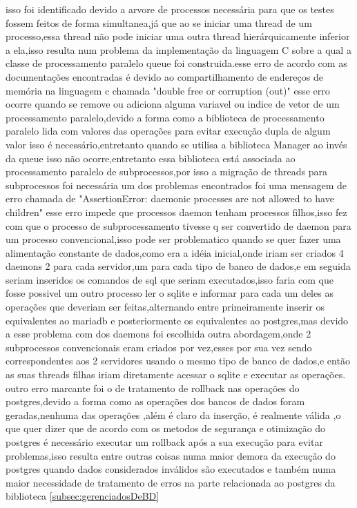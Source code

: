 \documentclass[
	12pt,				%
	openright,			%
	oneside,			%
	a4paper,			%
	english,			%
	french,				%
	spanish,			%
	brazil,				%
	]{abntex2}
\begin{document}
isso foi identificado devido a arvore de processos necessária para que os testes fossem feitos de forma simultanea,já que ao se iniciar uma thread de um processo,essa thread não pode iniciar uma outra thread hierárquicamente inferior a ela,isso resulta num problema da implementação da linguagem C sobre a qual a classe de processamento paralelo queue foi construida.esse erro de acordo com as documentações encontradas é devido ao compartilhamento de endereços de memória na linguagem c chamada "double free or corruption (out)" esse erro ocorre quando se remove ou adiciona alguma variavel ou indice de vetor de um processamento paralelo,devido a forma como a biblioteca de processamento paralelo lida com valores das operações para evitar execução dupla de algum valor isso é necessário,entretanto quando se utilisa a biblioteca Manager ao invés da queue isso não ocorre,entretanto essa biblioteca está associada ao processamento paralelo de subprocessos,por isso a migração de threads para subprocessos foi necessária\newline
um dos problemas encontrados foi uma mensagem de erro chamada de "AssertionError: daemonic processes are not allowed to have children" esse erro impede que processos daemon tenham processos filhos,isso fez com que o processo de subprocessamento tivesse q ser convertido de daemon para um processo convencional,isso pode ser problematico quando se quer fazer uma alimentação constante de dados,como era a idéia inicial,onde iriam ser criados 4 daemons 2 para cada servidor,um para cada tipo de banco de dados,e em seguida seriam inseridos os comandos de sql que seriam executados,isso faria com que fosse possivel um outro processo ler o sqlite e informar para cada um deles as operações que deveriam ser feitas,alternando entre primeiramente inserir os equivalentes ao mariadb e posteriormente os equivalentes ao postgres,mas devido a esse problema com dos daemons foi escolhida outra abordagem,onde 2 subprocessos convencionais eram criados por vez,esses por sua vez sendo correspondentes aos 2 servidores usando o mesmo tipo de banco de dados,e então as suas threads filhas iriam diretamente acessar o sqlite e executar as operações.\newline
outro erro marcante foi o de tratamento de rollback nas operações do postgres,devido a forma como as operações dos bancos de dados foram geradas,nenhuma das operações ,além é claro da inserção, é realmente válida ,o que quer dizer que de acordo com os metodos de segurança e otimização do postgres é necessário executar um rollback após a sua execução para evitar problemas,isso resulta entre outras coisas numa maior demora da execução do postgres quando dados considerados inválidos são executados e também numa maior necessidade de tratamento de erros na parte relacionada ao postgres da biblioteca \autoref{subsec:gerenciadosDeBD}
\end{document}
